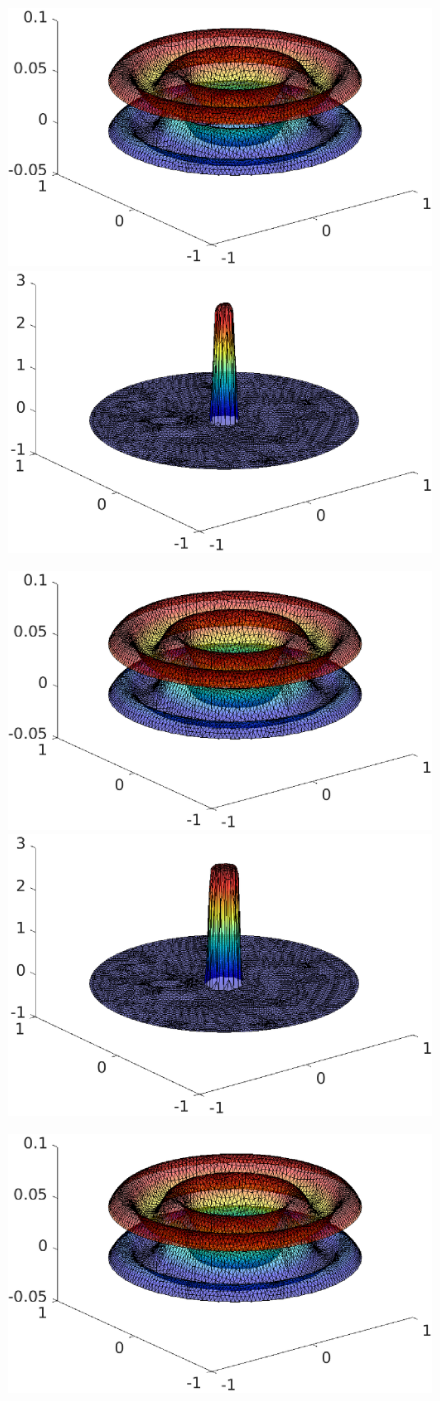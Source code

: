 \begin{frame}
\begin{overprint}
\begin{figure}
\end{figure}
\begin{figure}
\includegraphics[width=0.48 \textwidth]{fig_article_chap_2/test_case_128/fig_u1u2_hmax0,09_Dt0,001_tt07.eps} 
\quad
\includegraphics[width=0.48 \textwidth]{fig_article_chap_2/test_case_128/fig_lambda_hmax0,09_Dt0,001_tt07.eps} 
\end{figure}
\begin{figure}
\includegraphics[width=0.48 \textwidth]{fig_article_chap_2/test_case_128/fig_u1u2_hmax0,09_Dt0,001_tt08.eps} 
\quad
\includegraphics[width=0.48 \textwidth]{fig_article_chap_2/test_case_128/fig_lambda_hmax0,09_Dt0,001_tt08.eps} 
\end{figure}
\begin{figure}
\includegraphics[width=0.48 \textwidth]{fig_article_chap_2/test_case_128/fig_u1u2_hmax0,09_Dt0,001_tt09.eps} 

\end{figure}
\end{overprint}
\end{frame}
